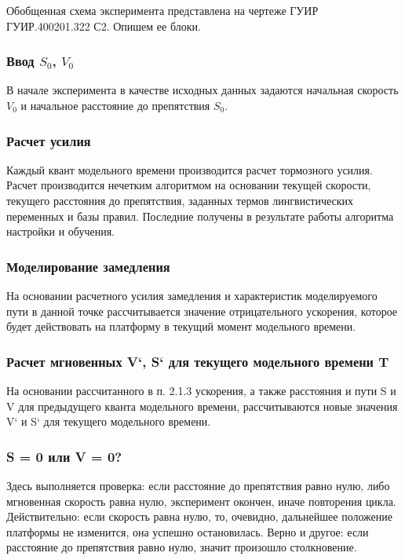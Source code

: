 Обобщенная схема эксперимента представлена на чертеже ГУИР ГУИР.400201.322 С2. Опишем ее блоки.

\subsubsection{Ввод $S_0$, $V_0$}

В начале эксперимента в качестве исходных данных задаются начальная скорость $V_0$ и начальное расстояние до препятствия $S_0$.

\subsubsection{Расчет усилия }

Каждый квант модельного времени производится расчет тормозного усилия. Расчет производится нечетким алгоритмом на основании текущей скорости, текущего расстояния до препятствия, заданных термов лингвистических переменных и базы правил. Последние получены в результате работы алгоритма настройки и обучения.

\subsubsection{ Моделирование замедления}

На основании расчетного усилия  замедления и характеристик моделируемого пути в данной точке рассчитывается значение отрицательного ускорения, которое будет действовать на платформу в текущий момент модельного времени.

\subsubsection{Расчет мгновенных V`, S` для текущего модельного времени T}

На основании рассчитанного в п. 2.1.3 ускорения, а также расстояния и пути S и V для предыдущего кванта модельного времени, рассчитываются новые значения V` и S` для текущего модельного времени.

\subsubsection{ S = 0 или V = 0? }
Здесь выполняется проверка: если расстояние до препятствия равно нулю, либо мгновенная скорость равна нулю, эксперимент окончен, иначе повторения цикла. Действительно: если скорость равна нулю, то, очевидно, дальнейшее положение платформы не изменится, она успешно остановилась. Верно и другое: если расстояние до препятствия равно нулю, значит произошло столкновение.


